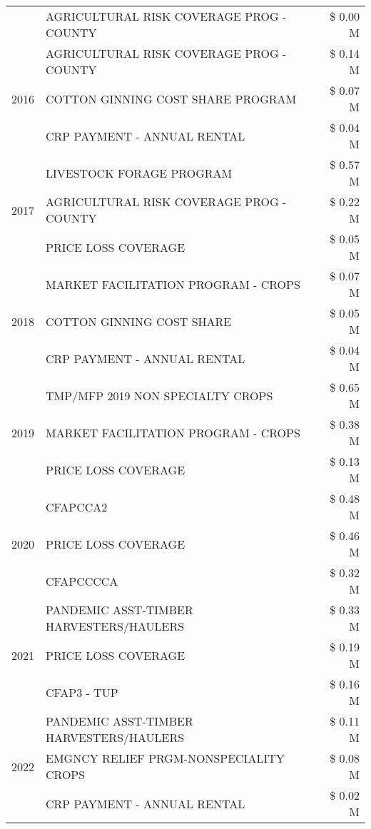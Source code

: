 \begin{tabular}{llr}
 & AGRICULTURAL RISK COVERAGE PROG - COUNTY & \$ 0.00 M \\
\cline{1-3}
\multirow[t]{3}{*}{2016} & AGRICULTURAL RISK COVERAGE PROG - COUNTY & \$ 0.14 M \\
 & COTTON GINNING COST SHARE PROGRAM & \$ 0.07 M \\
 & CRP PAYMENT - ANNUAL RENTAL & \$ 0.04 M \\
\cline{1-3}
\multirow[t]{3}{*}{2017} & LIVESTOCK FORAGE PROGRAM & \$ 0.57 M \\
 & AGRICULTURAL RISK COVERAGE PROG - COUNTY & \$ 0.22 M \\
 & PRICE LOSS COVERAGE & \$ 0.05 M \\
\cline{1-3}
\multirow[t]{3}{*}{2018} & MARKET FACILITATION PROGRAM - CROPS & \$ 0.07 M \\
 & COTTON GINNING COST SHARE & \$ 0.05 M \\
 & CRP PAYMENT - ANNUAL RENTAL & \$ 0.04 M \\
\cline{1-3}
\multirow[t]{3}{*}{2019} & TMP/MFP 2019 NON SPECIALTY CROPS & \$ 0.65 M \\
 & MARKET FACILITATION PROGRAM - CROPS & \$ 0.38 M \\
 & PRICE LOSS COVERAGE & \$ 0.13 M \\
\cline{1-3}
\multirow[t]{3}{*}{2020} & CFAPCCA2 & \$ 0.48 M \\
 & PRICE LOSS COVERAGE & \$ 0.46 M \\
 & CFAPCCCCA & \$ 0.32 M \\
\cline{1-3}
\multirow[t]{3}{*}{2021} & PANDEMIC ASST-TIMBER HARVESTERS/HAULERS & \$ 0.33 M \\
 & PRICE LOSS COVERAGE & \$ 0.19 M \\
 & CFAP3 - TUP & \$ 0.16 M \\
\cline{1-3}
\multirow[t]{3}{*}{2022} & PANDEMIC ASST-TIMBER HARVESTERS/HAULERS & \$ 0.11 M \\
 & EMGNCY RELIEF PRGM-NONSPECIALITY CROPS & \$ 0.08 M \\
 & CRP PAYMENT - ANNUAL RENTAL & \$ 0.02 M \\
\cline{1-3}
\bottomrule
\end{tabular}
